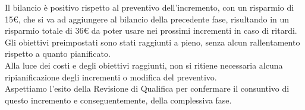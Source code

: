 Il bilancio è positivo rispetto al preventivo dell'incremento, con un risparmio di 15\euro{}, che si va ad aggiungere al bilancio della precedente fase, risultando in un risparmio totale di 36\euro{} da poter usare nei prossimi incrementi in caso di ritardi.
Gli obiettivi preimpostati sono stati raggiunti a pieno, senza alcun rallentamento rispetto a quanto pianificato.\\
Alla luce dei costi e degli obiettivi raggiunti, non si ritiene necessaria alcuna ripianificazione degli incrementi o modifica del preventivo.\\
Aspettiamo l'esito della Revisione di Qualifica per confermare il consuntivo di questo incremento e conseguentemente, della complessiva fase.


